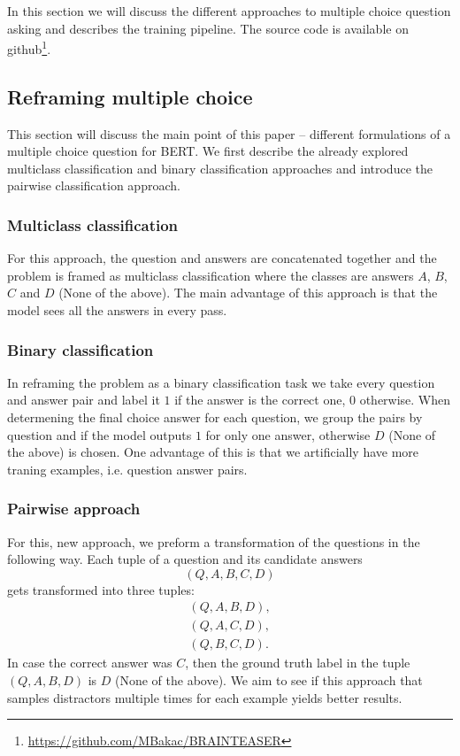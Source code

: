 In this section we will discuss the different approaches to multiple choice question asking and describes the training pipeline.
The source code is available on github\footnote[3]{\url{https://github.com/MBakac/BRAINTEASER}}.
\subsection{Reframing multiple choice}
This section will discuss the main point of this paper -- different formulations of a multiple choice question for BERT.
We first describe the already explored multiclass classification and binary classification approaches and introduce the pairwise classification approach.

\subsubsection{Multiclass classification}
For this approach, the question and answers are concatenated together and the problem is framed as multiclass classification where the classes are answers $A$, $B$, $C$ and $D$ (None of the above).
The main advantage of this approach is that the model sees all the answers in every pass.

\subsubsection{Binary classification}
In reframing the problem as a binary classification task we take every question and answer pair and label it $1$ if the answer is the correct one, $0$ otherwise.
When determening the final choice answer for each question, we group the pairs by question and if the model outputs $1$ for only one answer, otherwise $D$ (None of the above) is chosen.
One advantage of this is that we artificially have more traning examples, i.e. question answer pairs.

\subsubsection{Pairwise approach}
For this, new approach, we preform a transformation of the questions in the following way.
Each tuple of a question and its candidate answers
$$
    (Q,A,B,C,D)
$$
gets transformed into three tuples:
\begin{align*}
       (Q,A,B,D), \\
       (Q,A,C,D), \\
       (Q,B,C,D).
\end{align*}
In case the correct answer was $C$, then the ground truth label in the tuple $(Q,A,B,D)$ is $D$ (None of the above).
We aim to see if this approach that samples distractors multiple times for each example yields better results.


